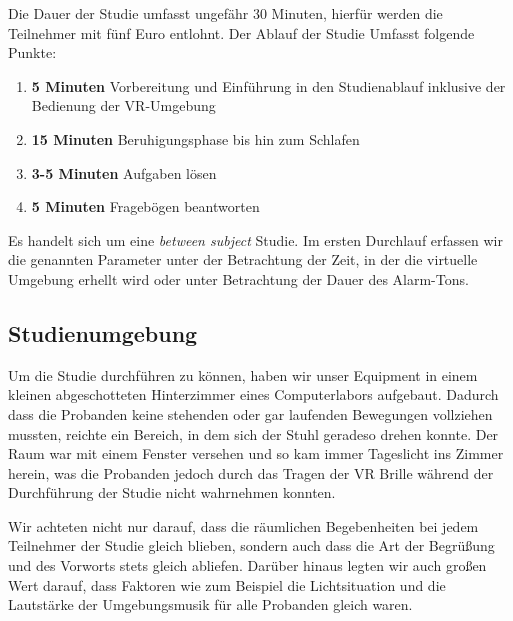 Die Dauer der Studie umfasst ungefähr 30 Minuten, hierfür werden die Teilnehmer mit fünf Euro entlohnt. Der Ablauf der Studie Umfasst folgende Punkte:

\begin{enumerate}
	\item \textbf{5 Minuten} Vorbereitung und Einführung in den Studienablauf inklusive der Bedienung der VR-Umgebung
	\item \textbf{15 Minuten} Beruhigungsphase bis hin zum Schlafen
	\item \textbf{3-5 Minuten} Aufgaben lösen
	\item \textbf{5 Minuten} Fragebögen beantworten
\end{enumerate}

Es handelt sich um eine \textit{between subject} Studie. Im ersten Durchlauf erfassen wir die genannten Parameter unter der Betrachtung der Zeit, in der die virtuelle Umgebung erhellt wird oder unter Betrachtung der Dauer des Alarm-Tons.

\subsection{Studienumgebung}

Um die Studie durchführen zu können, haben wir unser Equipment in einem kleinen abgeschotteten Hinterzimmer eines Computerlabors aufgebaut. Dadurch dass die Probanden keine stehenden oder gar laufenden Bewegungen vollziehen mussten, reichte ein Bereich, in dem sich der Stuhl geradeso drehen konnte. Der Raum war mit einem Fenster versehen und so kam immer Tageslicht ins Zimmer herein, was die Probanden jedoch durch das Tragen der VR Brille während der Durchführung der Studie nicht wahrnehmen konnten. 

Wir achteten nicht nur darauf, dass die räumlichen Begebenheiten bei jedem Teilnehmer der Studie gleich blieben, sondern auch dass die Art der Begrüßung und des Vorworts stets gleich abliefen. 
Darüber hinaus legten wir auch großen Wert darauf, dass Faktoren wie zum Beispiel die Lichtsituation und die Lautstärke der Umgebungsmusik für alle Probanden gleich waren.
